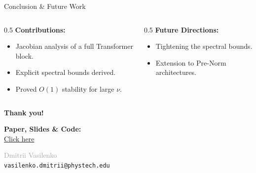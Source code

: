 \documentclass[aspectratio=169, 11pt]{beamer}
\begin{document}
\begin{frame}{Conclusion \& Future Work}
    \begin{columns}
        \begin{column}{0.5\textwidth}
            \textbf{Contributions:}
            \begin{itemize}
                \item Jacobian analysis of a full Transformer block.
                \item Explicit spectral bounds derived.
                \item Proved $O(1)$ stability for large $\nu$.
            \end{itemize}
        \end{column}
        \begin{column}{0.5\textwidth}
            \textbf{Future Directions:}
            \begin{itemize}
                \item Tightening the spectral bounds.
                \item Extension to Pre-Norm architectures.
            \end{itemize}
        \end{column}
    \end{columns}
\end{frame}

\begin{frame}[plain]
    \centering
    \vspace{3em}
    {\Huge \textcolor{miptblue}{\textbf{Thank you!}}}

    \vspace{2em}
    {\large \textbf{Paper, Slides \& Code:}} \\
    \vspace{0.5em}
    {\normalsize \href{https://github.com/Dimundel/Jacobian-Analysis-of-a-Recurrent-Transformer-Block}{Click here}}

    \vspace{2em}
    \small \textcolor{darkgray}{Dmitrii Vasilenko} \\
    \texttt{vasilenko.dmitrii@phystech.edu}
\end{frame}
\end{document}
